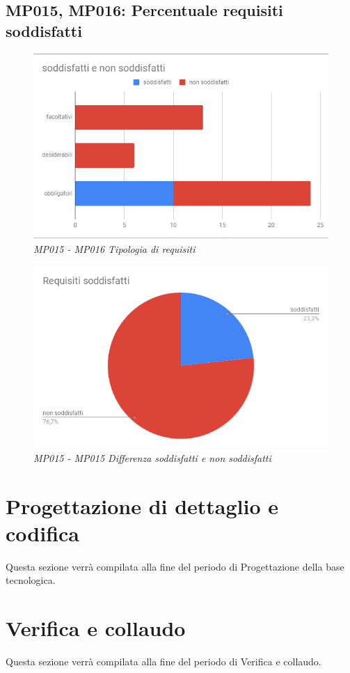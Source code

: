 \subsection{MP015, MP016: Percentuale requisiti soddisfatti}
\begin{figure} [h]
    \centering
	\includegraphics[scale=0.5]{./images/req.PNG}
    \caption{\textit{MP015 - MP016 Tipologia di requisiti}}\label{}
\end{figure}
\begin{figure} [h]
    \centering
	\includegraphics[scale=0.5]{./images/RequisitiSoddisfatti.png}
    \caption{\textit{MP015 - MP015 Differenza soddisfatti e non soddisfatti}}\label{}
\end{figure}

\newpage
\section{Progettazione di dettaglio e codifica}
Questa sezione verrà compilata alla fine del periodo di Progettazione della base tecnologica.
\section{Verifica e collaudo}
Questa sezione verrà compilata alla fine del periodo di Verifica e collaudo.